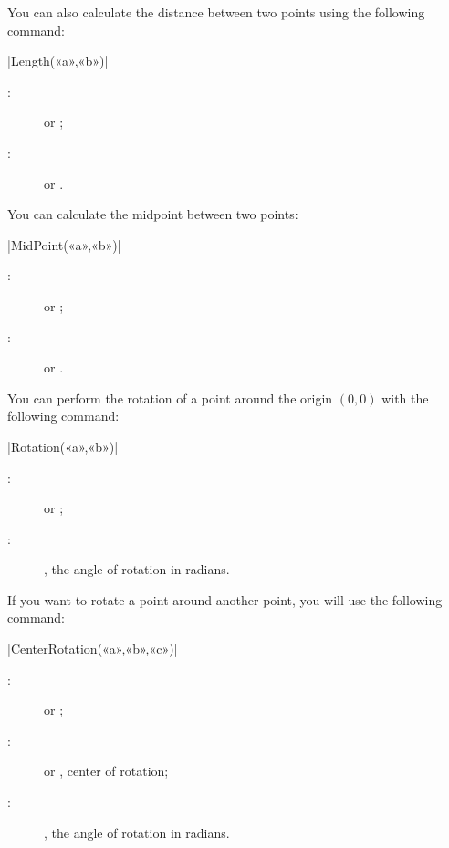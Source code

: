 \documentclass[a4paper,english]{article}
\begin{document}
You can also calculate the distance between two points using the following command:
\begin{colourband}
\macro|Length(«a»,«b»)|
\begin{description}
  \item[:]  or ;
  \item[:]  or .
\end{description}
\end{colourband}

You can calculate the midpoint between two points:
\begin{colourband}
\macro|MidPoint(«a»,«b»)|
\begin{description}
  \item[:]  or ;
  \item[:]  or .
\end{description}
\end{colourband}

You can perform the rotation of a point around the origin $(0,0)$ with the following command:
\begin{colourband}
\macro|Rotation(«a»,«b»)|
\begin{description}
  \item[:]  or ;
  \item[:] , the angle of rotation in radians.
\end{description}
\end{colourband}

If you want to rotate a point around another point, you will use the following command:
\begin{colourband}
\macro|CenterRotation(«a»,«b»,«c»)|
\begin{description}
  \item[:]  or ;
  \item[:]  or , center of rotation;
  \item[:] , the angle of rotation in radians.
\end{description}
\end{colourband}
\end{document}
